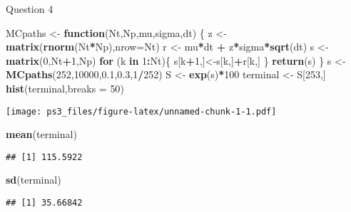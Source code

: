 \documentclass[
]{article}
\author{}
\date{\vspace{-2.5em}}
\newenvironment{Shaded}{\begin{snugshade}}{\end{snugshade}}
\newcommand{\ControlFlowTok}[1]{\textcolor[rgb]{0.13,0.29,0.53}{\textbf{#1}}}
\newcommand{\DataTypeTok}[1]{\textcolor[rgb]{0.13,0.29,0.53}{#1}}
\newcommand{\DecValTok}[1]{\textcolor[rgb]{0.00,0.00,0.81}{#1}}
\newcommand{\FloatTok}[1]{\textcolor[rgb]{0.00,0.00,0.81}{#1}}
\newcommand{\KeywordTok}[1]{\textcolor[rgb]{0.13,0.29,0.53}{\textbf{#1}}}
\newcommand{\NormalTok}[1]{#1}
\newcommand{\OperatorTok}[1]{\textcolor[rgb]{0.81,0.36,0.00}{\textbf{#1}}}
\newcommand{\StringTok}[1]{\textcolor[rgb]{0.31,0.60,0.02}{#1}}
\begin{document}
Question 4

\begin{Shaded}
\begin{Highlighting}[]
\NormalTok{MCpaths <-}\StringTok{ }\ControlFlowTok{function}\NormalTok{(Nt,Np,mu,sigma,dt) \{}
\NormalTok{  z <-}\StringTok{ }\KeywordTok{matrix}\NormalTok{(}\KeywordTok{rnorm}\NormalTok{(Nt}\OperatorTok{*}\NormalTok{Np),}\DataTypeTok{nrow=}\NormalTok{Nt)}
\NormalTok{  r <-}\StringTok{ }\NormalTok{mu}\OperatorTok{*}\NormalTok{dt }\OperatorTok{+}\StringTok{ }\NormalTok{z}\OperatorTok{*}\NormalTok{sigma}\OperatorTok{*}\KeywordTok{sqrt}\NormalTok{(dt)}
\NormalTok{  s <-}\StringTok{ }\KeywordTok{matrix}\NormalTok{(}\DecValTok{0}\NormalTok{,Nt}\OperatorTok{+}\DecValTok{1}\NormalTok{,Np)}
  \ControlFlowTok{for}\NormalTok{ (k }\ControlFlowTok{in} \DecValTok{1}\OperatorTok{:}\NormalTok{Nt)\{}
\NormalTok{    s[k}\OperatorTok{+}\DecValTok{1}\NormalTok{,]<-s[k,]}\OperatorTok{+}\NormalTok{r[k,]}
\NormalTok{  \}}
  \KeywordTok{return}\NormalTok{(s)}
\NormalTok{\}}
\NormalTok{s <-}\StringTok{ }\KeywordTok{MCpaths}\NormalTok{(}\DecValTok{252}\NormalTok{,}\DecValTok{10000}\NormalTok{,}\FloatTok{0.1}\NormalTok{,}\FloatTok{0.3}\NormalTok{,}\DecValTok{1}\OperatorTok{/}\DecValTok{252}\NormalTok{)}
\NormalTok{S <-}\StringTok{ }\KeywordTok{exp}\NormalTok{(s)}\OperatorTok{*}\DecValTok{100}
\NormalTok{terminal <-}\StringTok{ }\NormalTok{S[}\DecValTok{253}\NormalTok{,]}
\KeywordTok{hist}\NormalTok{(terminal,}\DataTypeTok{breaks =} \DecValTok{50}\NormalTok{)}
\end{Highlighting}
\end{Shaded}

\texttt{[image: ps3\_files/figure-latex/unnamed-chunk-1-1.pdf]}

\begin{Shaded}
\begin{Highlighting}[]
\KeywordTok{mean}\NormalTok{(terminal)}
\end{Highlighting}
\end{Shaded}

\begin{verbatim}
## [1] 115.5922
\end{verbatim}

\begin{Shaded}
\begin{Highlighting}[]
\KeywordTok{sd}\NormalTok{(terminal)}
\end{Highlighting}
\end{Shaded}

\begin{verbatim}
## [1] 35.66842
\end{verbatim}
\end{document}
